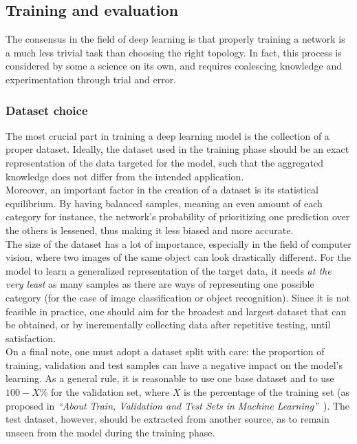 \subsection{Training and evaluation} \label{section:training}

The consensus in the field of deep learning is that properly training a network
is a much less trivial task than choosing the right topology. In fact, this
process is considered by some a science on its own, and requires coalescing
knowledge and experimentation through trial and error.

	\subsubsection{Dataset choice}

The most crucial part in training a deep learning model is the collection of a
proper dataset. Ideally, the dataset used in the training phase should be an
exact representation of the data targeted for the model, such that the
aggregated knowledge does not differ from the intended application.\\

Moreover, an important factor in the creation of a dataset is its statistical
equilibrium. By having balanced samples, meaning an even amount of each
category for instance, the network's probability of prioritizing one prediction
over the others is lessened, thus making it less biased and more accurate.\\

The size of the dataset has a lot of importance, especially in the
field of computer vision, where two images of the same object can look
drastically different. For the model to learn a generalized representation of
the target data, it needs \emph{at the very least} as many samples as
there are ways of representing one possible category (for the case of image
classification or object recognition). Since it is not feasible in practice,
one should aim for the broadest and largest dataset that can be obtained, or
by incrementally collecting data after repetitive testing, until
satisfaction.\\

On a final note, one must adopt a dataset split with care: the proportion of
training, validation and test samples can have a negative impact on the 
model's learning. As a general rule, it is reasonable to use one base dataset
and to use $100-X\%$ for the validation set, where $X$ is the percentage of the
training set (as proposed in \emph{``About Train, Validation and Test Sets in Machine
Learning''}~\cite{DatasetSplitting}). The test dataset, however, should be
extracted from another source, as to remain unseen from the model during the
training phase.

